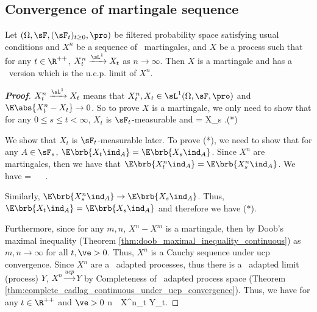 \subsection{Convergence of martingale sequence}

\begin{theorem}\label{thm:convergence_ucp_cadlag_martingale}
Let $(\Omega,\sF,(\sF_t)_{t\geq 0},\pro)$ be filtered probability space satisfying usual conditions and $X^n$ be a sequence of \cadlag\ martingales, and $X$ be a process such that for any $t\in \R^{++}$, $X^n_t \xrightarrow{\sL^1} X_t$ as $n\to \infty$. Then $X$ is a martingale and has a \cadlag\ version which is the u.c.p. limit of $X^n$.
\end{theorem}

\begin{proof}[\bf Proof]%
$X^n_t \xrightarrow{\sL^1} X_t$ means that $X^n_t,X_t \in \sL^1(\Omega,\sF,\pro)$ and $\E\abs{X^n_t - X_t} \to 0$. So to prove $X$ is a martingale, we only need to show that for any $0\leq s\leq t < \infty$, $X_t$ is $\sF_t$-measurable and
\be
\E{} = X_s .\qquad (*)
\ee

We show that $X_t$ is $\sF_t$-measurable later. To prove (*), we need to show that for any $A\in \sF_s$, $\E\brb{X_t\ind_A} = \E\brb{X_s\ind_A}$. Since $X^n$ are martingales, then we have that $\E\brb{X^n_t\ind_A} = \E\brb{X^n_s\ind_A}$. We have
\be
{} =  \leq \E{} \leq \E{}  \ \ra \ \E{} \to \E{}.
\ee

Similarly, $\E\brb{X^n_s\ind_A} \to \E\brb{X_s\ind_A}$. Thus, $\E\brb{X_t\ind_A} = \E\brb{X_s\ind_A}$ and therefore we have ($*$).

Furthermore, since for any $m,n$, $X^n-X^m$ is a martingale, then by Doob's maximal inequality (Theorem \ref{thm:doob_maximal_inequality_continuous})
\be
\pro{} \leq {} \E{} \leq {}  
\ee
as $m,n\to \infty$ for all $t,\ve>0$. Thus, $X^n$ is a Cauchy sequence under ucp convergence. Since $X^n$ are a \cadlag\ adapted processes, thus there is a \cadlag\ adapted limit (process) $Y$, $X^n \xrightarrow{ucp} Y$ by Completeness of \cadlag\ adapted process space (Theorem \ref{thm:complete_cadlag_continuous_under_ucp_convergence}). Thus, we have for any $t\in \R^{++}$ and $\ve >0$
\be
\pro{} \leq \pro{} \quad {}n\to \infty \ \ra \ X^n_t  Y_t.
\ee


\end{proof}
